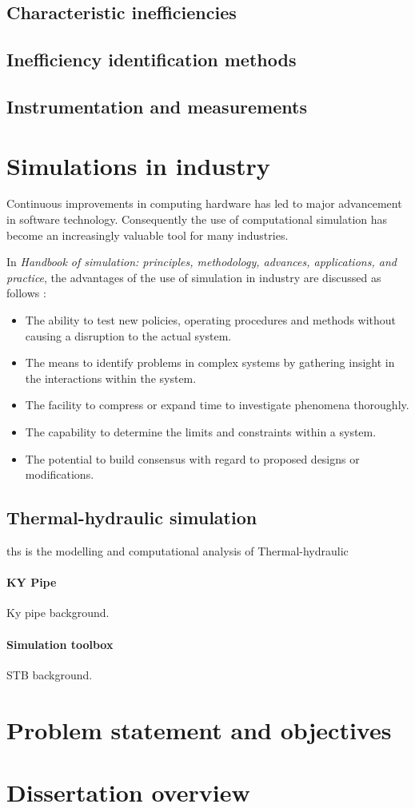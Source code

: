 	\subsection{Characteristic inefficiencies}
	\subsection{Inefficiency identification methods}
	\subsection{Instrumentation and measurements}
\section{Simulations in industry}

Continuous improvements in computing hardware has led to major advancement in software technology. Consequently the use of computational simulation has become an increasingly valuable tool for many industries.\cite{kocsis2003integration} \par 

 In \textit{ Handbook of simulation: principles, methodology, advances, applications, and practice}, the advantages of the use of simulation in industry are discussed as follows \cite{banks1998handbook}: 
\begin{itemize}
	\item The ability to test new policies, operating procedures and methods without causing a disruption to the actual system.
	\item The means to identify problems in complex systems by gathering insight in the interactions within the system.
	\item The facility to compress or expand time to investigate phenomena thoroughly.
	\item The capability to determine the limits and constraints within a system.
	\item The potential to build consensus with regard to proposed designs or modifications.
\end{itemize}

\subsection{Thermal-hydraulic simulation}
\gls{ths} is the modelling and  computational analysis of Thermal-hydraulic
\paragraph{KY Pipe}
Ky pipe background. \cite{Wood1993KYPipe}
\paragraph{Simulation toolbox}
STB background.
\section{Problem statement and objectives}
\section{Dissertation overview}